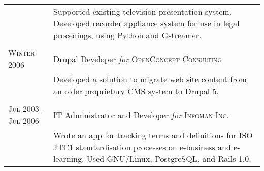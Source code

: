 \documentclass[letterpaper,10pt]{article}
\begin{document}
\begin{longtable}{p{3cm}|p{12cm}}
   & \footnotesize{Supported existing television presentation system.  Developed recorder appliance system for use in legal procedings, using Python and Gstreamer.} \\
  \multicolumn{2}{c}{} \\
  \textsc{Winter 2006} & Drupal Developer \emph{for} \textsc{OpenConcept Consulting} \\
   & \footnotesize{Developed a solution to migrate web site content from an older proprietary CMS system to Drupal 5.} \\
  \multicolumn{2}{c}{} \\
  \textsc{Jul 2003-Jul 2006} & IT Administrator and Developer \emph{for} \textsc{Infoman Inc.} \\
   & \footnotesize{Wrote an app for tracking terms and definitions for ISO JTC1 standardisation processes on e-business and e-learning.  Used GNU/Linux, PostgreSQL, and Rails 1.0.} \\
\end{longtable}
\end{document}
